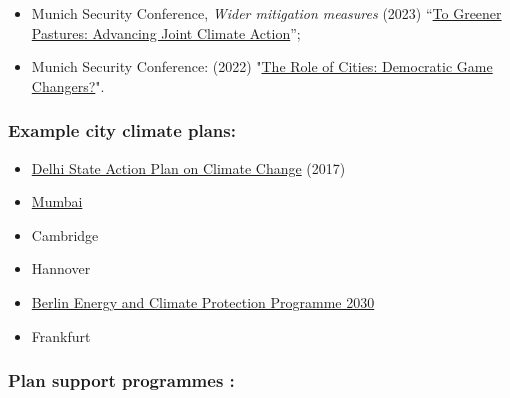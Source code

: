 \documentclass{article}
\begin{document}
\begin{itemize}
\item Munich Security Conference, \emph{Wider mitigation measures} (2023) “\href{https://www.youtube.com/live/wbLB6TwLIto?feature=share}{To Greener Pastures: Advancing Joint Climate Action}”;


\item Munich Security Conference: (2022) "\href{https://www.youtube.com/live/2FuPxnFMdG0?feature=share&t=3128}{The Role of Cities: Democratic Game Changers?}".


\end{itemize}

\subsubsection{Example city climate plans: }\label{H5715858}


\begin{itemize}
\item \href{https://moef.gov.in/wp-content/uploads/2017/08/Delhi-State-Action-Plan-on-Cimate-Change.pdf}{Delhi State Action Plan on Climate Change} (2017)


\item \href{https://mcap.mcgm.gov.in/}{Mumbai}


\item Cambridge


\item Hannover


\item \href{https://www.berlin.de/sen/uvk/en/climate-action/berlin-energy-and-climate-protection-programme-2030-bek-2030/}{Berlin Energy and Climate Protection Programme 2030}


\item Frankfurt


\end{itemize}

\subsubsection{Plan support programmes :}\label{H3402659}
\end{document}
